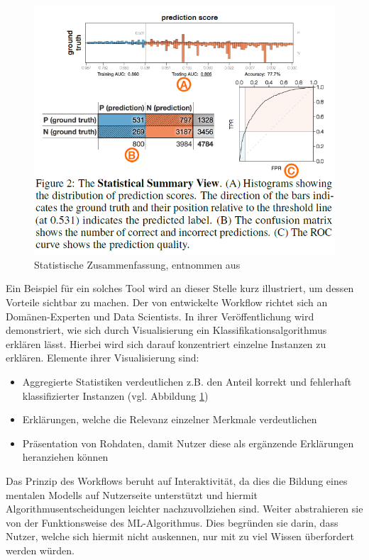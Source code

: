 \begin{figure}
    \centering
    \includegraphics[scale=0.45]{pic/MA-Bilder/Literaturrecherche/25-statistsiche Summary.PNG}
    \caption{Statistische Zusammenfassung, entnommen aus \cite{krause2017workflow}}
    \label{Fig:Krause-statistischeSummary}
\end{figure}
Ein Beispiel für ein solches Tool wird an dieser Stelle kurz illustriert, um dessen Vorteile sichtbar zu machen. Der von \textcite{krause2017workflow}  entwickelte Workflow richtet sich an Domänen-Experten und Data Scientists. In ihrer Veröffentlichung wird demonstriert, wie sich durch Visualisierung ein Klassifikationsalgorithmus erklären lässt. Hierbei wird sich darauf konzentriert einzelne Instanzen zu erklären. Elemente ihrer Visualisierung sind: 
\begin{itemize}
    \item Aggregierte Statistiken verdeutlichen z.B. den Anteil korrekt und fehlerhaft klassifizierter Instanzen (vgl. Abbildung \ref{Fig:Krause-statistischeSummary})
    \item Erklärungen, welche die Relevanz einzelner Merkmale verdeutlichen
    \item Präsentation von Rohdaten, damit Nutzer diese als ergänzende Erklärungen heranziehen können
\end{itemize}
Das Prinzip des Workflows beruht auf Interaktivität, da dies die Bildung eines mentalen Modells auf Nutzerseite unterstützt und hiermit Algorithmusentscheidungen leichter nachzuvollziehen sind. Weiter abstrahieren sie von der Funktionsweise des ML-Algorithmus. Dies begründen sie darin, dass Nutzer, welche sich hiermit nicht auskennen, nur mit zu viel Wissen überfordert werden würden.
